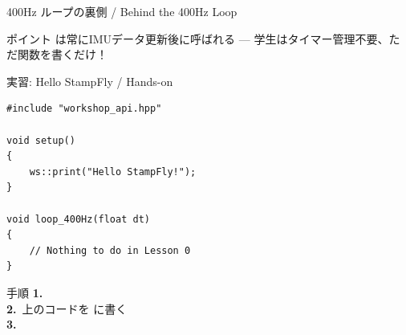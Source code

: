 \begin{frame}{400Hz ループの裏側 / Behind the 400Hz Loop}
  \begin{center}
    \vspace{-2mm}
    \resizebox{0.85\textwidth}{!}{}
  \end{center}

  \vspace{-0.5em}

  \begin{exampleblock}{ポイント}
     は常にIMUデータ更新後に呼ばれる
    --- 学生はタイマー管理不要、ただ関数を書くだけ！
  \end{exampleblock}
\end{frame}

\begin{frame}[fragile]{実習: Hello StampFly / Hands-on}
  \begin{lstlisting}[style=sfcpp, title={user\_code.cpp}]
#include "workshop_api.hpp"

void setup()
{
    ws::print("Hello StampFly!");
}

void loop_400Hz(float dt)
{
    // Nothing to do in Lesson 0
}
  \end{lstlisting}
  \vspace{-0.8em}
  \begin{exampleblock}{手順}\small
    \textbf{1.}~\\
    \textbf{2.}~上のコードを  に書く\\
    \textbf{3.}~
  \end{exampleblock}
\end{frame}

